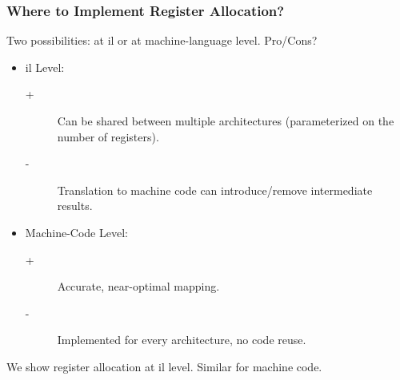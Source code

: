 \documentclass{beamer}
\renewcommand{\emph}[1]{\textcolor{structure}{#1}}
\newcommand{\emp}[1]{\textcolor{DikuRed}{ #1}}
\begin{document}
\begin{frame}[fragile,t]
   \frametitle{Where to Implement Register Allocation?}

\bigskip

Two possibilities: at {\sc il} or at machine-language level. \alert{Pro/Cons?}

\pause
\smallskip

\begin{itemize}

    \item \emph{{\sc il} Level:}

        \begin{description}
            \item[+] \emph{Can be shared between multiple architectures
                    (parameterized on the number of registers).}
            \item[-] \emp{Translation to machine code can introduce/remove
                        intermediate results.}
        \end{description}\bigskip


    \item \emph{Machine-Code Level:}

        \begin{description}
            \item[+] \emph{Accurate, near-optimal mapping.}
            \item[-] \emp{Implemented for every architecture, no code reuse.}
        \end{description}

\end{itemize}

\bigskip

We show register allocation at {\sc il} level. Similar for machine code.

\end{frame}
\end{document}
